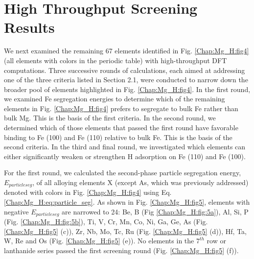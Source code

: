 \section{High Throughput Screening Results}

We next examined the remaining 67 elements identified in Fig. \ref{Chap:Mg_H:fig4} (all elements with colors in the periodic table) with high-throughput DFT computations. Three successive rounds of calculations, each aimed at addressing one of the three criteria listed in Section 2.1, were conducted to narrow down the broader pool of elements highlighted in Fig. \ref{Chap:Mg_H:fig4}. In the first round, we examined Fe segregation energies to determine which of the remaining elements in Fig. \ref{Chap:Mg_H:fig4} prefers to segregate to bulk Fe rather than bulk Mg. This is the basis of the first criteria. In the second round, we determined which of those elements that passed the first round have favorable binding to Fe (100) and Fe (110) relative to bulk Fe. This is the basis of the second criteria. In the third and final round, we investigated which elements can either significantly weaken or strengthen H adsorption on Fe (110) and Fe (100).


For the first round, we calculated the second-phase particle segregation energy, $E_{particle seg}$,  of all alloying elements X (except As, which was previously addressed) denoted with colors in Fig. \ref{Chap:Mg_H:fig4} using Eq. \ref{Chap:Mg_H:eq:particle_seg}. As shown in Fig. \ref{Chap:Mg_H:fig5}, elements with negative $E_{particle seg}$ are narrowed to 24: Be, B (Fig \ref{Chap:Mg_H:fig:5a}), Al, Si, P (Fig. \ref{Chap:Mg_H:fig:5b}), Ti, V, Cr, Mn, Co, Ni, Ga, Ge, As (Fig. \ref{Chap:Mg_H:fig5} (c)), Zr, Nb, Mo, Tc, Ru (Fig. \ref{Chap:Mg_H:fig5} (d)), Hf, Ta, W, Re and Os (Fig. \ref{Chap:Mg_H:fig5} (e)). No elements in the $7^{th}$ row or lanthanide series passed the first screening round (Fig. \ref{Chap:Mg_H:fig5} (f)).



